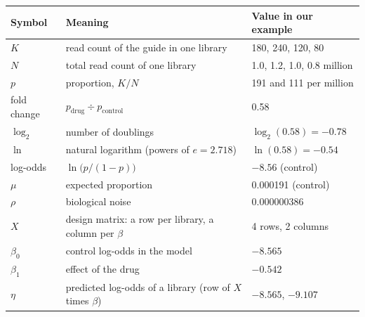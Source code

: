 \begin{center}
\small
\begin{tabular}{@{}l p{6.3cm} l@{}}
\toprule
Symbol & Meaning & Value in our example\\
\midrule
$K$ & read count of the guide in one library & 180, 240, 120, 80\\
$N$ & total read count of one library & 1.0, 1.2, 1.0, 0.8 million\\
$p$ & proportion, $K/N$ & 191 and 111 per million\\
fold change & $p_{\text{drug}} \div p_{\text{control}}$ & 0.58\\
$\log_2$ & number of doublings & $\log_2(0.58) = -0.78$\\
$\ln$ & natural logarithm (powers of $e = 2.718$) & $\ln(0.58) = -0.54$\\
log-odds & $\ln\bigl(p/(1-p)\bigr)$ & $-8.56$ (control)\\
$\mu$ & expected proportion & 0.000191 (control)\\
$\rho$ & biological noise & 0.000000386\\
$X$ & design matrix: a row per library, a column per $\beta$ & 4 rows, 2 columns\\
$\beta_0$ & control log-odds in the model & $-8.565$\\
$\beta_1$ & effect of the drug & $-0.542$\\
$\eta$ & predicted log-odds of a library (row of $X$ times $\beta$) & $-8.565$, $-9.107$\\
\bottomrule
\end{tabular}
\end{center}


\newpage


